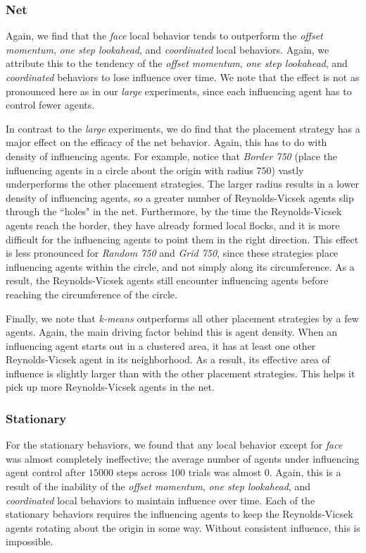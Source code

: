 \subsubsection{Net}
Again, we find that the \textit{face} local behavior tends to outperform the
\textit{offset momentum}, \textit{one step lookahead}, and \textit{coordinated}
local behaviors.
Again, we attribute this to the tendency of the \textit{offset momentum},
\textit{one step lookahead}, and \textit{coordinated} behaviors to lose
influence over time.
We note that the effect is not as pronounced here as in our \textit{large}
experiments, since each influencing agent has to control fewer agents.

In contrast to the \textit{large} experiments, we do find that the placement
strategy has a major effect on the efficacy of the net behavior.
Again, this has to do with density of influencing agents.
For example, notice that \textit{Border 750} (place the influencing agents in a
circle about the origin with radius $750$) vastly underperforms the other
placement strategies.
The larger radius results in a lower density of influencing agents, so a greater
number of Reynolds-Vicsek agents slip through the ``holes" in the net.
Furthermore, by the time the Reynolds-Vicsek agents reach the border, they have already
formed local flocks, and it is more difficult for the influencing agents to
point them in the right direction.
This effect is less pronounced for \textit{Random 750} and \textit{Grid 750},
since these strategies place influencing agents within the circle, and not simply
along its circumference.
As a result, the Reynolds-Vicsek agents still encounter influencing agents before
reaching the circumference of the circle.

Finally, we note that \textit{k-means} outperforms all other placement strategies
by a few agents.
Again, the main driving factor behind this is agent density.
When an influencing agent starts out in a clustered area, it has at least one
other Reynolds-Vicsek agent in its neighborhood.
As a result, its effective area of influence is slightly larger than with the
other placement strategies.
This helps it pick up more Reynolds-Vicsek agents in the net.

\subsubsection{Stationary}
For the stationary behaviors, we found that any local behavior except for
\textit{face} was almost completely ineffective; the average number of agents
under influencing agent control after $15000$ steps across $100$ trials was
almost $0$.
Again, this is a result of the inability of the \textit{offset momentum},
\textit{one step lookahead}, and \textit{coordinated} local behaviors to
maintain influence over time.
Each of the stationary behaviors requires the influencing agents to keep the
Reynolds-Vicsek agents rotating about the origin in some way.
Without consistent influence, this is impossible.

